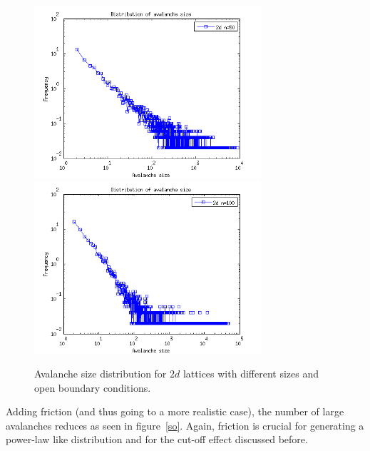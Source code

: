 \begin{figure}
\begin{center}
\includegraphics[width=0.75\textwidth]{results/2sn50.png}
\includegraphics[width=0.75\textwidth]{results/2sn100.png}
\caption{Avalanche size distribution for $2d$ lattices with different sizes and open boundary conditions.}
\label{sn}
\end{center}
\end{figure} 

Adding friction (and thus going to a more realistic case), the number of large avalanches reduces as seen in figure~\ref{so}. Again, friction is crucial for generating a power-law like distribution and for the cut-off effect discussed before.

